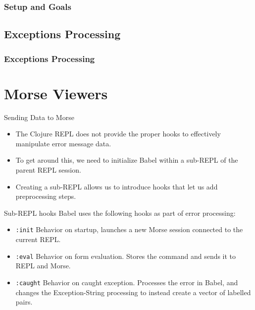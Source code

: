 \documentclass{beamer}
\begin{document}
\begin{frame}
\frametitle{Setup and Goals}

\end{frame}

\subsection{Exceptions Processing}

\begin{frame}
\frametitle{Exceptions Processing}

\end{frame}

\section{Morse Viewers}

\begin{frame}{Sending Data to Morse}
  \begin{itemize}
    \item<1-> The Clojure REPL does not provide the proper hooks to effectively manipulate error message data.
    \item<2-> To get around this, we need to initialize Babel within a sub-REPL of the parent REPL session.
    \item<3-> Creating a sub-REPL allows us to introduce hooks that let us add preprocessing steps.
  \end{itemize}
\end{frame}

\begin{frame}{Sub-REPL hooks}
  Babel uses the following hooks as part of error processing:
  \begin{itemize}
    \item<1-> \texttt{:init} Behavior on startup, launches a new Morse session connected to the current REPL.
    \item<2-> \texttt{:eval} Behavior on form evaluation. Stores the command and sends it to REPL and Morse.
    \item<3-> \texttt{:caught} Behavior on caught exception. Processes the error in Babel, and changes the Exception-\>String processing to instead create a vector of labelled pairs.  
  \end{itemize}
\end{frame}
\end{document}
